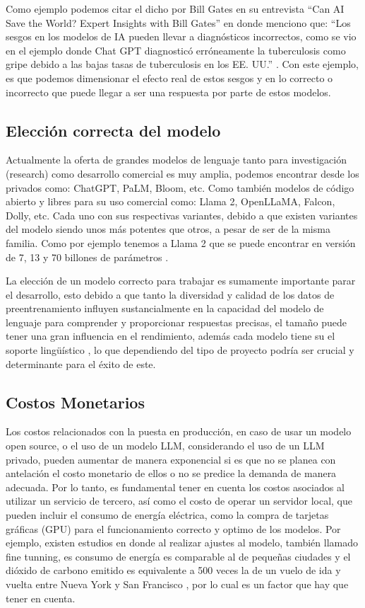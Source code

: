 Como ejemplo podemos citar el dicho por Bill Gates en su entrevista ``Can AI Save the World? Expert Insights with Bill Gates'' en donde menciono que: 
``Los sesgos en los modelos de IA pueden llevar a diagnósticos incorrectos, como se vio en el ejemplo donde Chat GPT diagnosticó erróneamente la 
tuberculosis como gripe debido a las bajas tasas de tuberculosis en los EE. UU.'' \cite{billgates1}. Con este ejemplo, es que podemos dimensionar el efecto real de estos sesgos y
en lo correcto o incorrecto que puede llegar a ser una respuesta por parte de estos modelos.

\subsection{Elección correcta del modelo}
Actualmente la oferta de grandes modelos de lenguaje tanto para investigación (research) como desarrollo comercial es muy amplia, podemos encontrar desde los privados como: ChatGPT, PaLM, Bloom, etc. 
Como también modelos de código abierto y libres para su uso comercial como: Llama 2, OpenLLaMA, Falcon, Dolly, etc. \cite{modelos2} Cada uno con sus respectivas variantes, debido a que existen 
variantes del modelo siendo unos más potentes que otros, a pesar de ser de la misma familia. Como por ejemplo tenemos a Llama 2 que se puede encontrar en versión de 7, 13 y 70 billones de parámetros \cite{modelos3}. 

La elección de un modelo correcto para trabajar es sumamente importante parar el desarrollo, esto debido a que tanto la diversidad y calidad de los datos de preentrenamiento influyen 
sustancialmente en la capacidad del modelo de lenguaje para comprender y proporcionar respuestas precisas, el tamaño puede tener una 
gran influencia en el rendimiento, además cada modelo tiene su el soporte lingüístico \cite{modelos1}, lo que dependiendo del tipo de proyecto podría ser crucial y determinante para el éxito de este.  


\subsection{Costos Monetarios}
Los costos relacionados con la puesta en producción, en caso de usar un modelo open source, o el uso de un modelo LLM, considerando el uso de un LLM privado, pueden aumentar de manera exponencial si es que no se planea con antelación el costo monetario de ellos o no se predice la demanda de manera adecuada. Por lo tanto, es fundamental tener en 
cuenta los costos asociados al utilizar un servicio de tercero, así como el costo de operar un servidor local, que pueden incluir el consumo de energía eléctrica, como la compra de tarjetas gráficas (GPU) para el funcionamiento correcto y optimo de los modelos.
Por ejemplo, existen estudios en donde al realizar ajustes al modelo, también llamado fine tunning, es consumo de energía es comparable al de pequeñas ciudades y el dióxido 
de carbono emitido es equivalente a 500 veces la de un vuelo de ida y vuelta entre Nueva York y San Francisco \cite{ft1}, por lo cual es un factor que hay que tener en cuenta. 


